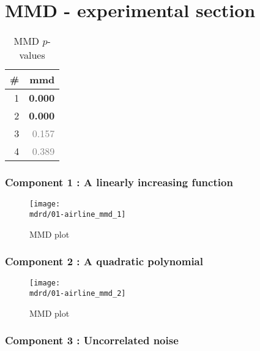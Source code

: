 \documentclass{article} %
\begin{document}
\section{MMD - experimental section}
\label{sec:mmd}

\begin{table}[htb]
\begin{center}
{\small
\begin{tabular}{|r|r|}
\hline
\bf{\#} & {mmd}\\
\hline

1 & \textbf{0.000}\\

2 & \textbf{0.000}\\

3 & \textcolor{gray}{0.157}\\

4 & \textcolor{gray}{0.389}\\

\hline
\end{tabular}
\caption{
MMD $p$-values
}
\label{table:mmd}
}
\end{center}
\end{table}

\subsubsection{Component 1 : A linearly increasing function}

\begin{figure}[H]
\newcommand{\wmgd}{0.5\columnwidth}
\newcommand{\hmgd}{3.0cm}
\newcommand{\mdrd}{01-airline}
\newcommand{\mbm}{\hspace{-0.3cm}}
\texttt{[image: \\mdrd/01-airline\_mmd\_1]}
\caption{
MMD plot}
\label{fig:mmd1}
\end{figure}

\subsubsection{Component 2 : A quadratic polynomial}

\begin{figure}[H]
\newcommand{\wmgd}{0.5\columnwidth}
\newcommand{\hmgd}{3.0cm}
\newcommand{\mdrd}{01-airline}
\newcommand{\mbm}{\hspace{-0.3cm}}
\texttt{[image: \\mdrd/01-airline\_mmd\_2]}
\caption{
MMD plot}
\label{fig:mmd2}
\end{figure}

\subsubsection{Component 3 : Uncorrelated noise}
\end{document}
